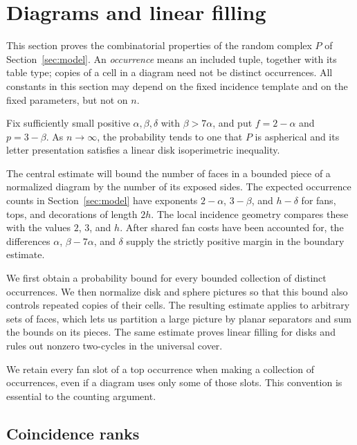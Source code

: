 \section{Diagrams and linear filling}\label{sec:diagrams}

This section proves the combinatorial properties of the random complex
$P$ of Section~\ref{sec:model}.  An \emph{occurrence} means an included
tuple, together with its table type; copies of a cell in a diagram need
not be distinct occurrences.  All constants in this section may depend
on the fixed incidence template and on the fixed parameters, but not on
$n$.

\begin{theorem}\label{thm:diagram}
Fix sufficiently small positive $\alpha,\beta,\delta$ with
$\beta>7\alpha$, and put $f=2-\alpha$ and $p=3-\beta$.
As $n\longrightarrow\infty$, the probability tends to one that $P$ is
aspherical and its letter presentation satisfies a linear disk
isoperimetric inequality.
\end{theorem}

The central estimate will bound the number of faces in a bounded
piece of a normalized diagram by the number of its exposed sides. The expected
occurrence counts in Section~\ref{sec:model} have exponents
$2-\alpha$, $3-\beta$, and $h-\delta$ for fans, tops, and decorations
of length $2h$. The local incidence geometry compares these with the
values $2$, $3$, and $h$. After shared fan costs have been accounted
for, the differences $\alpha$, $\beta-7\alpha$, and $\delta$ supply the
strictly positive margin in the boundary estimate.

We first obtain a probability bound for every bounded collection of
distinct occurrences. We then normalize disk and sphere pictures so
that this bound also controls repeated copies of their cells. The
resulting estimate applies to arbitrary sets of faces, which lets us
partition a large picture by planar separators and sum the bounds on
its pieces. The same estimate proves linear filling for disks and
rules out nonzero two-cycles in the universal cover.

We retain every fan slot of a top occurrence when making a collection of
occurrences, even if a diagram uses only some of those slots.  This
convention is essential to the counting argument.

\subsection{Coincidence ranks}

